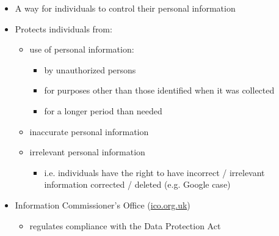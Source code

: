 \documentclass{article}
\begin{document}
\begin{itemize}
\item A way for individuals to control their personal information
\item Protects individuals from:
\begin{itemize}
\item use of personal information:
\begin{itemize}
\item by unauthorized persons
\item for purposes other than those identified when it was collected
\item for a longer period than needed
\end{itemize}
\item inaccurate personal information 
\item irrelevant personal information
\begin{itemize}
\item i.e. individuals have the right to have incorrect / irrelevant information corrected / deleted (e.g. Google case)
\end{itemize}
\end{itemize}
\end{itemize}

\bigskip
\begin{itemize}
\item Information Commissioner's Office (\href{https://ico.org.uk/}{ico.org.uk})
\begin{itemize}
\item regulates compliance with the Data Protection Act
\end{itemize}
\end{itemize}
\end{document}
